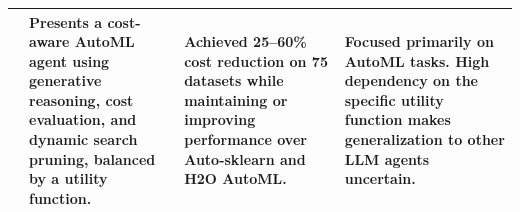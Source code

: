 \begin{table}[htbp]
\begin{tabular}{c p{} p{} p{}}
\cite{cost_aware_automl} &
Presents a cost-aware AutoML agent using generative reasoning, cost evaluation, and dynamic search pruning, balanced by a utility function.
&
Achieved 25--60\% cost reduction on 75 datasets while maintaining or improving performance over Auto-sklearn and H2O AutoML.
&
Focused primarily on AutoML tasks. High dependency on the specific utility function makes generalization to other LLM agents uncertain.
\\
\hline

\end{tabular}
\end{table}